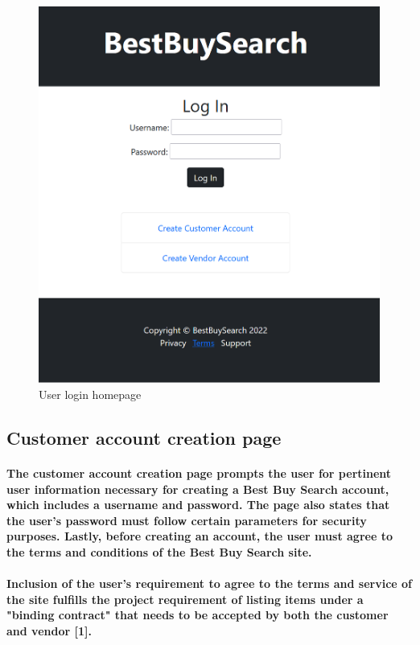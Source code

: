 \documentclass[sigconf]{acmart}
\begin{document}
\begin{figure}[H]
    \centering
    \includegraphics[scale=0.2]{login.PNG}
    \caption{User login homepage}
    \label{fig:my_label}
\end{figure}

\subsection{Customer account creation page}

\paragraph{The customer account creation page prompts the user for pertinent user information necessary for creating a Best Buy Search account, which includes a username and password. The page also states that the user's password must follow certain parameters for security purposes. Lastly, before creating an account, the user must agree to the terms and conditions of the Best Buy Search site.}

\paragraph{Inclusion of the user's requirement to agree to the terms and service of the site fulfills the project requirement of listing items under a "binding contract" that needs to be accepted by both the customer and vendor [1].}
\end{document}
